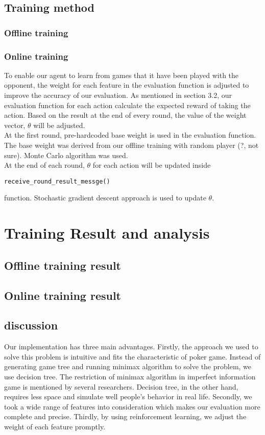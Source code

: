 \documentclass{article}
\begin{document}
\subsection{Training method}

\subsubsection{Offline training}

\subsubsection{Online training}
To enable our agent to learn from games that it have been played with the opponent, the weight for each feature in the evaluation function is adjusted to improve the accuracy of our evaluation. As mentioned in section 3.2, our evaluation function for each action calculate the expected reward of taking the action. Based on the result at the end of every round, the value of the weight vector, $\theta$ will be adjusted.
\\At the first round, pre-hardcoded base weight is used in the evaluation function. The base weight was derived from our offline training with random player (?, not sure). Monte Carlo algorithm was used.
\\At the end of each round, $\theta$ for each action will be updated inside \begin{verbatim}receive_round_result_messge() \end{verbatim}function. Stochastic gradient descent approach is used to update $\theta$.

\section{Training Result and analysis}
\subsection{Offline training result}
\subsection{Online training result}
\subsection{discussion}
Our implementation has three main advantages. Firstly, the approach we used to solve this problem is intuitive and fits the characteristic of poker game. Instead of generating game tree and running minimax algorithm to solve the problem, we use decision tree. The restriction of minimax algorithm in imperfect information game is mentioned by several researchers. Decision tree, in the other hand, requires less space and simulate well people's behavior in real life. Secondly, we took a wide range of features into consideration which makes our evaluation more complete and precise. Thirdly, by using reinforcement learning, we adjust the weight of each feature promptly.
\end{document}
